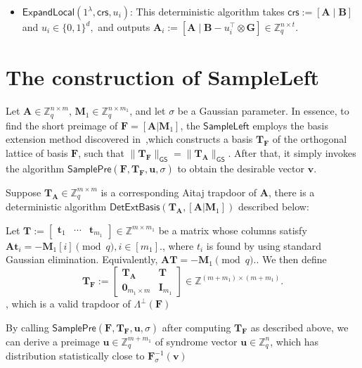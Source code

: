\begin{itemize}
    \item
    $\mathsf{ExpandLocal}(1^\lambda,\mathsf{crs},u_i)$:
    This deterministic algorithm takes
    $
        \mathsf{crs}:=[\mathbf A\mid \mathbf B]
    $
    and
    $
        u_i\in\{0,1\}^{d},
    $
    and outputs
    $
        \mathbf A_i
        :=
        [\mathbf A\mid \mathbf B-u_i^\top\otimes \mathbf G]
        \in \mathbb Z_q^{n\times t}.
    $
\end{itemize}
\section{The construction of SampleLeft}
Let $\mathbf A \in \mathbb Z_q^{n \times m}$, 
$\mathbf M_1 \in \mathbb Z_q^{n \times m_1}$, and let $\sigma$ be a Gaussian parameter. In essence, to find the short preimage of $\mathbf{F}=[\mathbf{A}|\mathbf{M}_1]$, the $\mathsf{SampleLeft}$ employs the basis extension method discovered in~\cite{EC:CasHofKilPei10},which constructs a basis $\mathbf{T_F}$ of the orthogonal lattice of basis $\mathbf{F}$, such that $\|\mathbf{T_F}\|_{\mathsf{GS}}=\|\mathbf{T_A}\|_{\mathsf{GS}}$. After that, it simply invokes the algorithm $\mathsf{SamplePre}(\mathbf{F},\mathbf{T_F},\mathbf{u},\sigma)$ to obtain the desirable vector $\mathbf{v}$. 

Suppose $\mathbf{T_A} \in \mathbb{Z}_q^{m \times m}$ is  a corresponding Aitaj trapdoor of $\mathbf{A}$, there is a deterministic algorithm $\mathsf{DetExtBasis}(\mathbf{T_A},[\mathbf{A}|\mathbf{M}_1])$ described below:

Let
$
    \mathbf{T}
    :=
    \begin{bmatrix}
        \mathbf{t}_1 & \cdots & \mathbf{t}_{m_1}
    \end{bmatrix}
    \in \mathbb{Z}^{m \times m_1}
$
be a matrix whose columns satisfy
$
    \mathbf{A}\mathbf{t}_i = -\mathbf{M}_1[i] \pmod q,
    i \in [m_1].
$, where $t_i$ is found by using standard Gaussian elimination.
Equivalently,
$
    \mathbf{A}\mathbf{T} = -\mathbf{M}_1 \pmod q .
$. We then define
\[
    \mathbf{T_F}
    :=
    \begin{bmatrix}
        \mathbf{T_A} & \mathbf{T} \\
        \mathbf{0}_{m_1 \times m} & \mathbf{I}_{m_1}
    \end{bmatrix}
    \in \mathbb{Z}^{(m+m_1)\times(m+m_1)} .
\]
, which is a valid trapdoor of $\Lambda^{\perp}(\mathbf{F})$



By calling $\mathsf{SamplePre}(\mathbf{F},\mathbf{T_F},\mathbf{u},\sigma)$ after computing $\mathbf{T_F}$ as described above, we can derive a preimage $\mathbf{u} \in \mathbb{Z}_q^{m + m_1}$ of syndrome vector $\mathbf{u} \in \mathbb{Z}_q^n$, which has distribution statistically close to $\mathbf{F}^{-1}_\sigma(\mathbf{v})$

